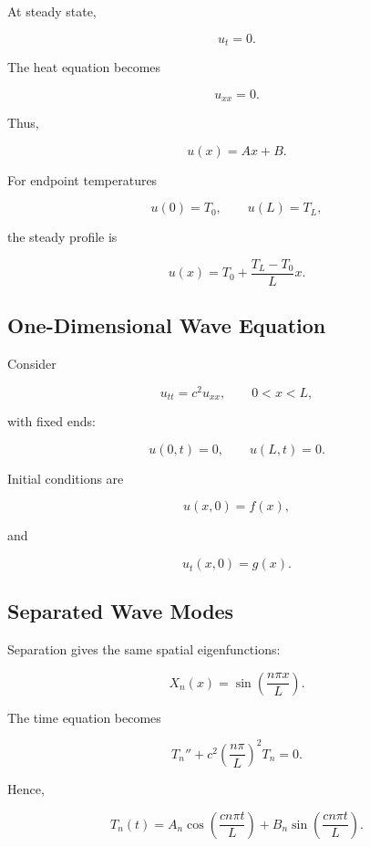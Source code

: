 At steady state,

\[
u_t=0.
\]

The heat equation becomes

\[
\boxed{
u_{xx}=0.
}
\]

Thus,

\[
\boxed{
u(x)
=
Ax+B.
}
\]

For endpoint temperatures

\[
u(0)=T_0,
\qquad
u(L)=T_L,
\]

the steady profile is

\[
\boxed{
u(x)
=
T_0
+
\frac{
T_L-T_0
}{
L
}x.
}
\]

\subsection{One-Dimensional Wave Equation}
\label{subsec:one-dimensional-wave-equation}

Consider

\[
\boxed{
u_{tt}
=
c^2u_{xx},
\qquad
0<x<L,
}
\]

with fixed ends:

\[
\boxed{
u(0,t)=0,
\qquad
u(L,t)=0.
}
\]

Initial conditions are

\[
\boxed{
u(x,0)=f(x),
}
\]

and

\[
\boxed{
u_t(x,0)=g(x).
}
\]

\subsection{Separated Wave Modes}
\label{subsec:wave-separated-modes}

Separation gives the same spatial eigenfunctions:

\[
\boxed{
X_n(x)
=
\sin
\left(
\frac{n\pi x}{L}
\right).
}
\]

The time equation becomes

\[
\boxed{
T_n''
+
c^2
\left(
\frac{n\pi}{L}
\right)^2
T_n
=
0.
}
\]

Hence,

\[
\boxed{
T_n(t)
=
A_n
\cos
\left(
\frac{cn\pi t}{L}
\right)
+
B_n
\sin
\left(
\frac{cn\pi t}{L}
\right).
}
\]

